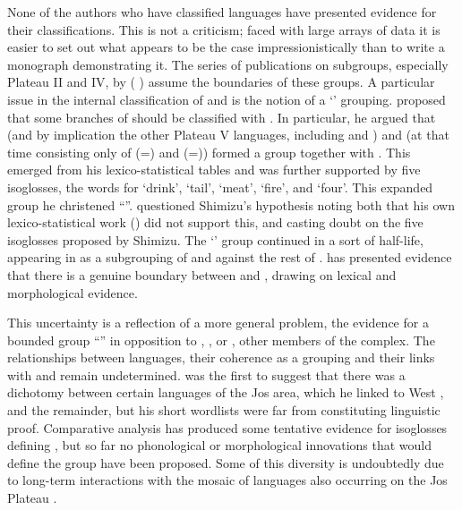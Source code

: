\documentclass[output=paper]{langsci/langscibook}
\begin{document}
\largerpage
None of the authors who have classified  languages have presented evidence for their classifications. This is not a criticism; faced with large arrays of data it is easier to set out what appears to be the case impressionistically than to write a monograph demonstrating it. The series of publications on  subgroups, especially Plateau II and IV, by
\citeauthor{Gerhardt1969a} (%
\citeyear*{Gerhardt1969a,
Gerhardt1969b,
Gerhardt1971,
Gerhardt19723a,
Gerhardt19723b,
Gerhardt19734,
Gerhardt1974,
Gerhardt1983a,
Gerhardt1983b,
Gerhardt1988a,
Gerhardt1988b,
Gerhardt1989,
Gerhardt1994}%
)
assume the boundaries of these groups. A particular issue in the internal classification of  and  is the notion of a ‘’ grouping. \citet[415]{Shimizu1975} proposed that some branches of  should be classified with . In particular, he argued that  (and by implication the other Plateau V languages, including  and ) and  (at that time consisting only of  (=) and  (=)) formed a group together with . This emerged from his lexico-statistical tables and was further supported by five isoglosses, the words for ‘drink’, ‘tail’, ‘meat’, ‘fire’, and ‘four’. This expanded group he christened ``''. \citet{Gerhardt1983b} questioned Shimizu’s hypothesis noting both that his own lexico-statistical work (\citealt{GerhardtJockers1981}) did not support this, and casting doubt on the five isoglosses proposed by Shimizu. The ‘’ group continued in a sort of half-life, appearing in \citet{Gerhardt1989} as a subgrouping of  and  against the rest of . \citet{Blench2005} has presented evidence that there is a genuine boundary between  and , drawing on lexical and morphological evidence.

\largerpage[-1]
This uncertainty is a reflection of a more general problem, the evidence for a bounded group ``'' in opposition to , ,  or , other members of the  complex. The relationships between  languages, their coherence as a grouping and their links with  and  remain undetermined. \citet{Rowlands1962} was the first to suggest that there was a dichotomy between certain languages of the Jos area, which he linked to West , and the remainder, but his short wordlists were far from constituting linguistic proof. Comparative analysis has produced some tentative evidence for isoglosses defining , but so far no phonological or morphological innovations that would define the group have been proposed. Some of this diversity is undoubtedly due to long-term interactions with the mosaic of  languages also occurring on the Jos Plateau \citep{Blench2003}.
\end{document}
